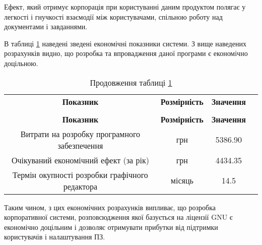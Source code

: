 \par Ефект, який отримує корпорація при користуванні даним продуктом полягає у легкості і гнучкості взаємодії між користувачами, спільною роботу над документами і завданнями.
\par В таблиці \ref{t:eco_4} наведені зведені економічні показники системи. З вище наведених розрахунків видно, що розробка та впровадження даної програми є економічно доцільною. 


{\footnotesize
\begin{longtable}{|c|c|c|c|}

\captionsetup{justification=centering}
\caption{Зведені економічні показники розробки системи}\label{t:eco_4}\\
\hline
\multicolumn{1}{|c|}{\textbf{Показник}}&
\multicolumn{1}{c|}{\textbf{Розмірність}}&
\multicolumn{1}{c|}{\textbf{Значення}}\\\hline

\endfirsthead
\caption*{\hfill Продовження таблиці \ref{t:eco_4}}\\\hline

\multicolumn{1}{|c|}{\textbf{Показник}}&
\multicolumn{1}{c|}{\textbf{Розмірність}}&
\multicolumn{1}{c|}{\textbf{Значення}}\\\hline
\endhead

Витрати на розробку програмного забезпечення & грн & 5386.90 \\ \hline
Очікуваний економічний ефект (за рік) & грн & 4434.35 \\ \hline
Термін окупності розробки графічного редактора & місяць & 14.5 \\ \hline

\end{longtable}
}

\par Таким чином, з цих економічних розрахунків випливає, що розробка корпоративної системи, розповсюдження якої базується на ліцензії GNU є економічно доцільним і дозволяє отримувати прибутки від підтримки користувачів і налаштування ПЗ.